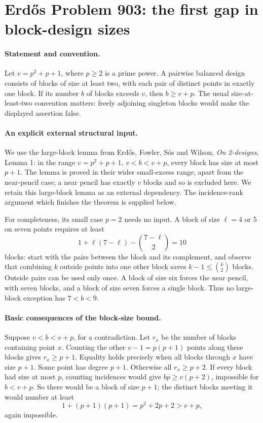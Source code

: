 \section*{Erd\H{o}s Problem 903: the first gap in block-design sizes}

\paragraph{Statement and convention.}
Let \(v=p^2+p+1\), where \(p\geq2\) is a prime power.
A pairwise balanced design consists of blocks of size
at least two, with each pair of distinct points in exactly
one block. If its number \(b\) of blocks exceeds \(v\),
then \(b\geq v+p\).
The usual size-at-least-two convention matters: freely
adjoining singleton blocks would make the displayed
assertion false.

\paragraph{An explicit external structural input.}
We use the large-block lemma from Erd\H{o}s, Fowler,
S\'os and Wilson, \emph{On 2-designs}, Lemma 1:
in the range \(v=p^2+p+1\), \(v<b<v+p\), every block
has size at most \(p+1\).
The lemma is proved in their wider small-excess range,
apart from the near-pencil case; a near pencil has
exactly \(v\) blocks and so is excluded here.
We retain this large-block lemma as an external dependency.
The incidence-rank argument which finishes the theorem
is supplied below.

For completeness, its small case \(p=2\) needs no input.
A block of size \(\ell=4\) or 5 on seven points requires
at least
\[
 1+\ell(7-\ell)-\binom{7-\ell}{2}=10
\]
blocks: start with the pairs between the block and its
complement, and observe that combining \(k\) outside
points into one other block saves \(k-1\leq\binom k2\)
blocks. Outside pairs can be used only once.
A block of size six forces the near pencil, with seven
blocks, and a block of size seven forces a single block.
Thus no large-block exception has \(7<b<9\).

\paragraph{Basic consequences of the block-size bound.}
Suppose \(v<b<v+p\), for a contradiction.
Let \(r_x\) be the number of blocks containing point \(x\).
Counting the other \(v-1=p(p+1)\) points along these
blocks gives \(r_x\geq p+1\). Equality holds precisely
when all blocks through \(x\) have size \(p+1\).
Some point has degree \(p+1\). Otherwise all \(r_x\geq p+2\).
If every block had size at most \(p\), counting incidences
would give \(bp\geq v(p+2)\), impossible for \(b<v+p\).
So there would be a block of size \(p+1\); the distinct
blocks meeting it would number at least
\[
 1+(p+1)(p+1)=p^2+2p+2>v+p,
\]
again impossible.

